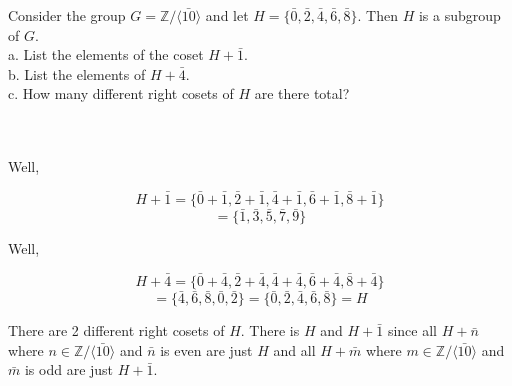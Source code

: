 Consider the group $G=\mathbb{Z}/\langle\bar{10}\rangle$ and let
$H=\{\bar{0},\bar{2},\bar{4},\bar{6},\bar{8}\}$. Then $H$ is a subgroup of $G$.\\

a. List the elements of the coset $H+\bar{1}$.\\

b. List the elements of $H+\bar{4}$.\\

c. How many different right cosets of $H$ are there total?\\\\

\begin{solution}\renewcommand{\qedsymbol}{}\ \\
    Well,
    
    $$H+\bar{1}=\{\bar{0}+\bar{1},\bar{2}+\bar{1},\bar{4}+\bar{1},\bar{6}+\bar{1},\bar{8}+\bar{1}\}$$
    $$=\{\bar{1},\bar{3},\bar{5},\bar{7},\bar{9}\}$$

    Well,
    
    $$H+\bar{4}=\{\bar{0}+\bar{4},\bar{2}+\bar{4},\bar{4}+\bar{4},\bar{6}+\bar{4},\bar{8}+\bar{4}\}$$
    $$=\{\bar{4},\bar{6},\bar{8},\bar{0},\bar{2}\}=\{\bar{0},\bar{2},\bar{4},\bar{6},\bar{8}\}=H$$

    There are 2 different right cosets of $H$. There is $H$ and $H+\bar{1}$ since all $H+\bar{n}$ where
    $n\in\mathbb{Z}/\langle\bar{10}\rangle$ and $\bar{n}$ is even are just $H$ and all $H+\bar{m}$ where
    $m\in\mathbb{Z}/\langle\bar{10}\rangle$ and $\bar{m}$ is odd are just $H+\bar{1}$.

\end{solution}